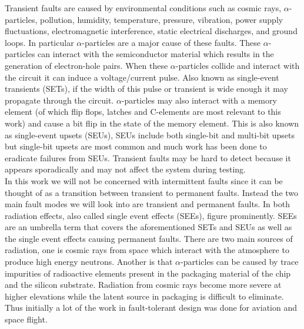 \documentclass[12pt]{report}
\begin{document}
Transient faults are caused by environmental conditions such as cosmic rays, $\alpha$-particles, pollution, humidity, temperature, pressure, vibration, power supply fluctuations, electromagnetic interference, static electrical discharges, and ground loops.  In particular $\alpha$-particles are a major cause of these faults.  These $\alpha$-particles can interact with the semiconductor material which results in the generation of electron-hole pairs. When these $\alpha$-particles collide and interact with the circuit it can induce a voltage/current pulse.  Also known as single-event transients (SETs), if the width of this pulse or transient is wide enough it may propagate through the circuit.  $\alpha$-particles may also interact with a memory element (of which flip flops, latches and C-elements are most relevant to this work) and cause a bit flip in the state of the memory element. This is also known as single-event upsets (SEUs), SEUs include both single-bit and multi-bit upsets but single-bit upsets are most common and much work has been done to eradicate failures from SEUs.  
Transient faults may be hard to detect because it appears sporadically and may not affect the system during testing. \\

In this work we will not be concerned with intermittent faults since it can be thought of as a transition between transient to permanent faults.  Instead the two main fault modes we will look into are transient and permanent faults.  In both radiation effects, also called single event effects (SEEs), figure prominently.  SEEs are an umbrella term that covers the aforementioned SETs and SEUs as well as the single event effects causing permanent faults.  There are two main sources of radiation, one is cosmic rays from space which interact with the atmosphere to produce high energy neutrons.  Another is that $\alpha$-particles can be caused by trace impurities of radioactive elements present in the packaging material of the chip and the silicon substrate.  Radiation from cosmic rays become more severe at higher elevations while the latent source in packaging is difficult to eliminate.  Thus initially a lot of the work in fault-tolerant design was done for aviation and space flight.


\end{document}
